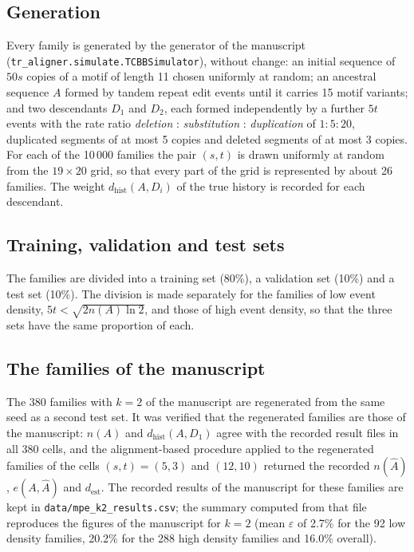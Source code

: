 \documentclass[11pt,a4paper]{article}
\newcommand{\dest}{d_{\mathrm{est}}}
\newcommand{\dhist}{d_{\mathrm{hist}}}
\newcommand{\Ahat}{\hat{A}}
\begin{document}
\subsection{Generation}

Every family is generated by the generator of the manuscript (\texttt{tr\_aligner.simulate.TCBBSimulator}), without change: an initial sequence of $50s$ copies of a motif of length 11 chosen uniformly at random; an ancestral sequence $A$ formed by tandem repeat edit events until it carries 15 motif variants; and two descendants $D_1$ and $D_2$, each formed independently by a further $5t$ events with the rate ratio \emph{deletion} : \emph{substitution} : \emph{duplication} of $1:5:20$, duplicated segments of at most 5 copies and deleted segments of at most 3 copies. For each of the 10\,000 families the pair $(s,t)$ is drawn uniformly at random from the $19\times 20$ grid, so that every part of the grid is represented by about 26 families. The weight $\dhist(A,D_i)$ of the true history is recorded for each descendant.

\subsection{Training, validation and test sets}

The families are divided into a training set (80\%), a validation set (10\%) and a test set (10\%). The division is made separately for the families of low event density, $5t<\sqrt{2n(A)\ln 2}$, and those of high event density, so that the three sets have the same proportion of each.

\subsection{The families of the manuscript}

The 380 families with $k=2$ of the manuscript are regenerated from the same seed as a second test set. It was verified that the regenerated families are those of the manuscript: $n(A)$ and $\dhist(A,D_1)$ agree with the recorded result files in all 380 cells, and the alignment-based procedure applied to the regenerated families of the cells $(s,t)=(5,3)$ and $(12,10)$ returned the recorded $n(\Ahat)$, $e(A,\Ahat)$ and $\dest$. The recorded results of the manuscript for these families are kept in \texttt{data/mpe\_k2\_results.csv}; the summary computed from that file reproduces the figures of the manuscript for $k=2$ (mean $\varepsilon$ of 2.7\% for the 92 low density families, 20.2\% for the 288 high density families and 16.0\% overall).
\end{document}
